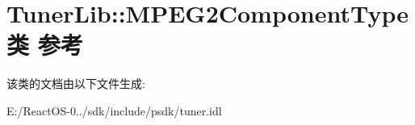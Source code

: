 \hypertarget{class_tuner_lib_1_1_m_p_e_g2_component_type}{}\section{Tuner\+Lib\+:\+:M\+P\+E\+G2\+Component\+Type类 参考}
\label{class_tuner_lib_1_1_m_p_e_g2_component_type}


该类的文档由以下文件生成\+:\begin{DoxyCompactItemize}
\item 
E\+:/\+React\+O\+S-\/0../sdk/include/psdk/tuner.\+idl\end{DoxyCompactItemize}

